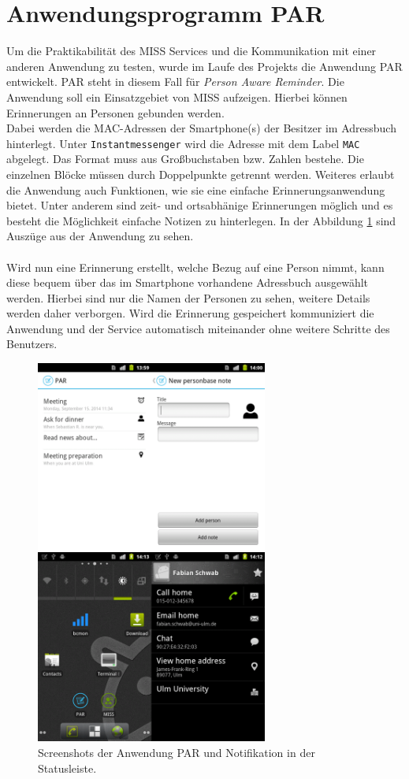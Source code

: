 \documentclass[]{report}
\begin{document}
\section{Anwendungsprogramm PAR}\label{lab:par}
Um die Praktikabilität des MISS Services und die Kommunikation mit einer anderen Anwendung zu testen, wurde im Laufe des Projekts die Anwendung PAR entwickelt. PAR steht in diesem Fall für \textit{Person Aware Reminder}. Die Anwendung soll ein Einsatzgebiet von MISS aufzeigen. Hierbei können Erinnerungen an Personen gebunden werden. \\
Dabei werden die MAC-Adressen der Smartphone(s) der Besitzer im Adressbuch hinterlegt. Unter \texttt{Instantmessenger} wird die Adresse mit dem Label \texttt{MAC} abgelegt. Das Format muss aus Großbuchstaben bzw. Zahlen bestehe. Die einzelnen Blöcke müssen durch Doppelpunkte getrennt werden. Weiteres erlaubt die Anwendung auch Funktionen, wie sie eine einfache Erinnerungsanwendung bietet. Unter anderem sind zeit- und ortsabhänige Erinnerungen möglich und es besteht die Möglichkeit einfache Notizen zu hinterlegen. In der Abbildung \ref{fig:par} sind Auszüge aus der Anwendung zu sehen. \\\\
Wird nun eine Erinnerung erstellt, welche Bezug auf eine Person nimmt, kann diese bequem über das im Smartphone vorhandene Adressbuch ausgewählt werden. Hierbei sind nur die Namen der Personen zu sehen, weitere Details werden daher verborgen. Wird die Erinnerung gespeichert kommuniziert die Anwendung und der Service automatisch miteinander ohne weitere Schritte des Benutzers.   
\begin{figure}[h!]
    \centering 
    \includegraphics[width=3.0in]{bilder/par.png}
    \caption{Screenshots der Anwendung PAR und Notifikation in der Statusleiste.}
    \label{fig:par}
\end{figure}
\end{document}
